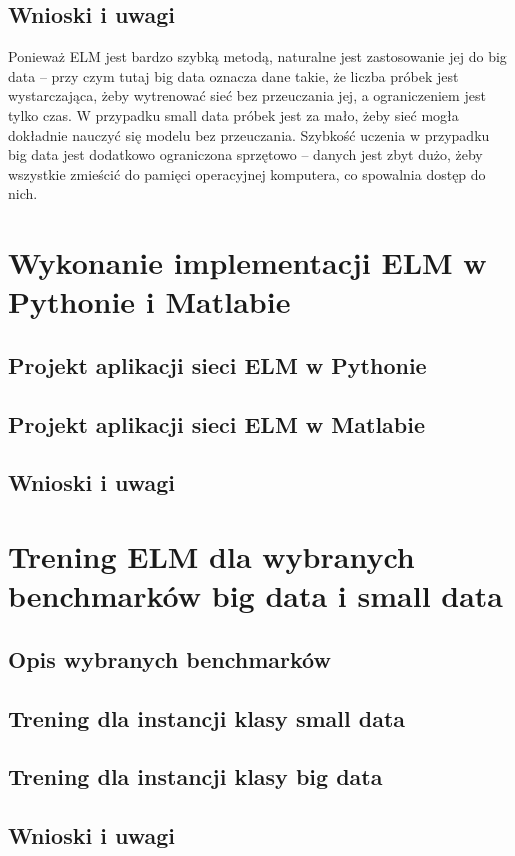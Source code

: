\documentclass{article}
\begin{document}
\subsection{Wnioski i uwagi}
Ponieważ ELM jest bardzo szybką metodą, naturalne jest zastosowanie jej do big data -- przy czym tutaj big data oznacza dane takie, że liczba próbek jest wystarczająca, żeby wytrenować sieć bez przeuczania jej, a ograniczeniem jest tylko czas. W przypadku small data próbek jest za mało, żeby sieć mogła dokładnie nauczyć się modelu bez przeuczania. Szybkość uczenia w przypadku big data jest dodatkowo ograniczona sprzętowo -- danych jest zbyt dużo, żeby wszystkie zmieścić do pamięci operacyjnej komputera, co spowalnia dostęp do nich.

\clearpage
\section{Wykonanie implementacji ELM w Pythonie i Matlabie}
\subsection{Projekt aplikacji sieci ELM w Pythonie}
\subsection{Projekt aplikacji sieci ELM w Matlabie}
\subsection{Wnioski i uwagi}
\clearpage
\section{Trening ELM dla wybranych benchmarków big data i small data}
\subsection{Opis wybranych benchmarków}
\subsection{Trening dla instancji klasy small data}
\subsection{Trening dla instancji klasy big data}
\subsection{Wnioski i uwagi}
\clearpage
\end{document}
